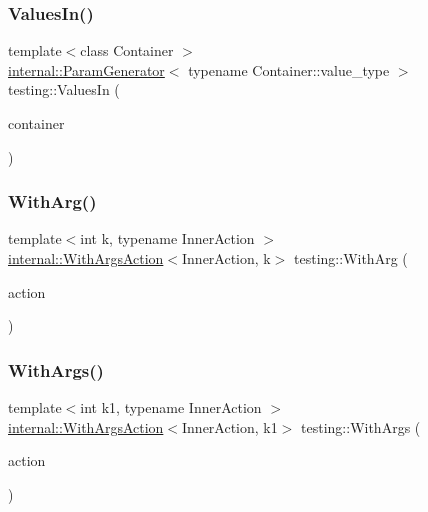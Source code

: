 \subsubsection{\texorpdfstring{ValuesIn()}{ValuesIn()}\hspace{0.1cm}{\footnotesize\ttfamily [3/3]}}
{\footnotesize\ttfamily template$<$class Container $>$ \\
\mbox{\hyperlink{classtesting_1_1internal_1_1ParamGenerator}{internal\+::\+Param\+Generator}}$<$ typename Container\+::value\+\_\+type $>$ testing\+::\+Values\+In (\begin{DoxyParamCaption}\item[{const Container \&}]{container }\end{DoxyParamCaption})}

\mbox{\label{namespacetesting_af76590c6cecc621e1ab4b681a9ea209b}} 
\subsubsection{\texorpdfstring{WithArg()}{WithArg()}}
{\footnotesize\ttfamily template$<$int k, typename Inner\+Action $>$ \\
\mbox{\hyperlink{classtesting_1_1internal_1_1WithArgsAction}{internal\+::\+With\+Args\+Action}}$<$Inner\+Action, k$>$ testing\+::\+With\+Arg (\begin{DoxyParamCaption}\item[{const Inner\+Action \&}]{action }\end{DoxyParamCaption})\hspace{0.3cm}{\ttfamily [inline]}}

\mbox{\label{namespacetesting_a3bd9eef13bee9065b19d3cd571829c7c}} 
\subsubsection{\texorpdfstring{WithArgs()}{WithArgs()}\hspace{0.1cm}{\footnotesize\ttfamily [1/10]}}
{\footnotesize\ttfamily template$<$int k1, typename Inner\+Action $>$ \\
\mbox{\hyperlink{classtesting_1_1internal_1_1WithArgsAction}{internal\+::\+With\+Args\+Action}}$<$Inner\+Action, k1$>$ testing\+::\+With\+Args (\begin{DoxyParamCaption}\item[{const Inner\+Action \&}]{action }\end{DoxyParamCaption})\hspace{0.3cm}{\ttfamily [inline]}}

